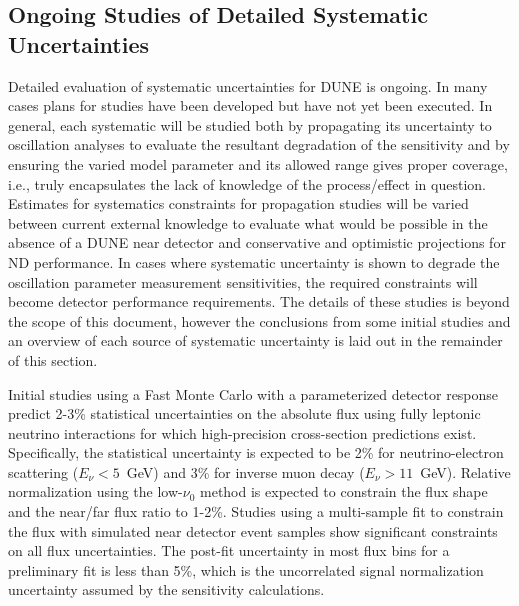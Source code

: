 \subsection{Ongoing Studies of Detailed Systematic Uncertainties}
\label{sec:syst_studies_ind}
Detailed evaluation of systematic uncertainties for DUNE is ongoing. In many cases plans for studies
have been developed but have not yet been executed. In general, each systematic will be studied both by
propagating its uncertainty to oscillation analyses to evaluate the resultant degradation of the sensitivity
and by ensuring the varied model parameter and its allowed range gives proper coverage, i.e., truly encapsulates
the lack of knowledge of the process/effect in question. Estimates for systematics constraints for
propagation studies will be varied between current external knowledge to evaluate what would be possible in the
absence of a DUNE near detector and conservative and optimistic projections
for ND performance. In cases where systematic uncertainty is shown to degrade the oscillation parameter
measurement sensitivities, the required constraints will become detector performance requirements.
The details of these studies is beyond the scope of this document, however the conclusions from some
initial studies and an overview of each source of systematic uncertainty is laid out in the remainder of this section.

Initial studies using a Fast Monte Carlo with a parameterized detector response
predict 2-3\% statistical uncertainties on the absolute flux using fully 
leptonic neutrino interactions for which high-precision cross-section predictions 
exist. Specifically,
the statistical uncertainty is expected to be 2\% for neutrino-electron
scattering ($E_\nu<5$~GeV) and 3\% for inverse muon decay ($E_\nu>11$~GeV).
Relative normalization using the low-$\nu_0$ method is
expected to constrain the flux shape and the near/far flux ratio to 1-2\%.
Studies using a multi-sample fit  to constrain the flux with simulated near detector
event samples show significant constraints on all flux
uncertainties. The post-fit uncertainty 
in most flux bins for a preliminary fit is less
than 5\%, which is the uncorrelated \numu signal normalization
uncertainty assumed by the sensitivity calculations. 

